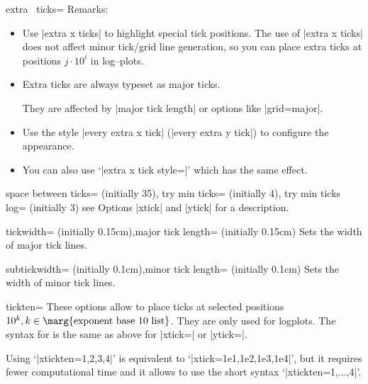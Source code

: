 \begin{pgfplotsxykey}{extra \x\ ticks=}
Remarks:
\begin{itemize} 
\item Use |extra x ticks| to highlight special tick positions. The use of |extra x ticks| does not affect minor tick/grid line generation, so you can place extra ticks at positions $j\cdot 10^i$ in log--plots. 
\item Extra ticks are always typeset as major ticks.

They are affected by |major tick length| or options like |grid=major|.
\item Use the style |every extra x tick| (|every extra y tick|) to configure the appearance.
\item You can also use `|extra x tick style=|' which has the same effect.
\end{itemize}
\end{pgfplotsxykey}

\begin{pgfplotskeylist}{
	space between ticks= (initially 35),
	try min ticks= (initially 4),
	try min ticks log= (initially 3)}
see Options |xtick| and |ytick| for a description.
\end{pgfplotskeylist}

\begin{pgfplotskeylist}{tickwidth= (initially 0.15cm),major tick length= (initially 0.15cm)}
	Sets the width of major tick lines.
\end{pgfplotskeylist}

\begin{pgfplotskeylist}{subtickwidth= (initially 0.1cm),minor tick length= (initially 0.1cm)}
	Sets the width of minor tick lines.
\end{pgfplotskeylist}

\begin{pgfplotsxykey}{\x tickten=}
These options allow to place ticks at selected positions $10^k, k \in \text{\marg{exponent base 10 list}}$. They are only used for logplots. The syntax for  is the same as above for |xtick=| or |ytick=|.

Using `|xtickten={1,2,3,4}|' is equivalent to `|xtick={1e1,1e2,1e3,1e4}|', but it requires fewer computational time and it allows to use the short syntax `|xtickten={1,...,4}|'.
\begin{codeexample}[]
\end{codeexample}
\end{pgfplotsxykey}

